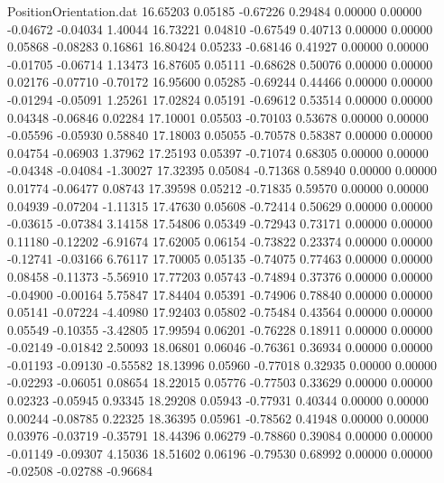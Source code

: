 \begin{filecontents}{PositionOrientation.dat}
  16.65203    0.05185   -0.67226     0.29484    0.00000    0.00000   -0.04672   -0.04034    1.40044
  16.73221    0.04810   -0.67549     0.40713    0.00000    0.00000    0.05868   -0.08283    0.16861
  16.80424    0.05233   -0.68146     0.41927    0.00000    0.00000   -0.01705   -0.06714    1.13473
  16.87605    0.05111   -0.68628     0.50076    0.00000    0.00000    0.02176   -0.07710   -0.70172
  16.95600    0.05285   -0.69244     0.44466    0.00000    0.00000   -0.01294   -0.05091    1.25261
  17.02824    0.05191   -0.69612     0.53514    0.00000    0.00000    0.04348   -0.06846    0.02284
  17.10001    0.05503   -0.70103     0.53678    0.00000    0.00000   -0.05596   -0.05930    0.58840
  17.18003    0.05055   -0.70578     0.58387    0.00000    0.00000    0.04754   -0.06903    1.37962
  17.25193    0.05397   -0.71074     0.68305    0.00000    0.00000   -0.04348   -0.04084   -1.30027
  17.32395    0.05084   -0.71368     0.58940    0.00000    0.00000    0.01774   -0.06477    0.08743
  17.39598    0.05212   -0.71835     0.59570    0.00000    0.00000    0.04939   -0.07204   -1.11315
  17.47630    0.05608   -0.72414     0.50629    0.00000    0.00000   -0.03615   -0.07384    3.14158
  17.54806    0.05349   -0.72943     0.73171    0.00000    0.00000    0.11180   -0.12202   -6.91674
  17.62005    0.06154   -0.73822     0.23374    0.00000    0.00000   -0.12741   -0.03166    6.76117
  17.70005    0.05135   -0.74075     0.77463    0.00000    0.00000    0.08458   -0.11373   -5.56910
  17.77203    0.05743   -0.74894     0.37376    0.00000    0.00000   -0.04900   -0.00164    5.75847
  17.84404    0.05391   -0.74906     0.78840    0.00000    0.00000    0.05141   -0.07224   -4.40980
  17.92403    0.05802   -0.75484     0.43564    0.00000    0.00000    0.05549   -0.10355   -3.42805
  17.99594    0.06201   -0.76228     0.18911    0.00000    0.00000   -0.02149   -0.01842    2.50093
  18.06801    0.06046   -0.76361     0.36934    0.00000    0.00000   -0.01193   -0.09130   -0.55582
  18.13996    0.05960   -0.77018     0.32935    0.00000    0.00000   -0.02293   -0.06051    0.08654
  18.22015    0.05776   -0.77503     0.33629    0.00000    0.00000    0.02323   -0.05945    0.93345
  18.29208    0.05943   -0.77931     0.40344    0.00000    0.00000    0.00244   -0.08785    0.22325
  18.36395    0.05961   -0.78562     0.41948    0.00000    0.00000    0.03976   -0.03719   -0.35791
  18.44396    0.06279   -0.78860     0.39084    0.00000    0.00000   -0.01149   -0.09307    4.15036
  18.51602    0.06196   -0.79530     0.68992    0.00000    0.00000   -0.02508   -0.02788   -0.96684

\end{filecontents}
